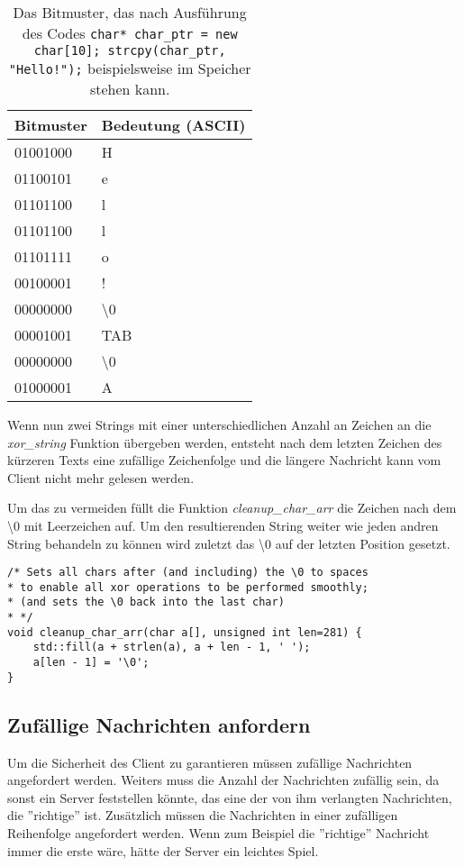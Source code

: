 \documentclass[]{article}
\begin{document}
\begin{table}[]
	\centering
	\begin{tabular}{l|l}
		Bitmuster  & Bedeutung (ASCII)\\ \hline
		01001000   & H                \\
		01100101   & e                \\
		01101100   & l                \\
		01101100   & l                \\
		01101111   & o                \\
		00100001   & !                \\
		00000000   & \textbackslash 0 \\
		00001001   & TAB              \\
		00000000   & \textbackslash 0 \\		
		01000001   & A                \\		
	\end{tabular}
	\caption{Das Bitmuster, das nach Ausführung des Codes \lstinline|char* char_ptr = new char[10]; strcpy(char_ptr, "Hello!");| beispielsweise im Speicher stehen kann.}
	\label{fig:bitcode_char_array}
\end{table}

Wenn nun zwei Strings mit einer unterschiedlichen Anzahl an Zeichen an die \textit{xor\_string} Funktion übergeben werden, entsteht nach dem letzten Zeichen des kürzeren Texts eine zufällige Zeichenfolge und die längere Nachricht kann vom Client nicht mehr gelesen werden.

Um das zu vermeiden füllt die Funktion \textit{cleanup\_char\_arr} die Zeichen nach dem \textbackslash 0 mit Leerzeichen auf. Um den resultierenden String weiter wie jeden andren String behandeln zu können wird zuletzt das \textbackslash 0 auf der letzten Position gesetzt.

\begin{lstlisting}
/* Sets all chars after (and including) the \0 to spaces
* to enable all xor operations to be performed smoothly;
* (and sets the \0 back into the last char)
* */
void cleanup_char_arr(char a[], unsigned int len=281) {
	std::fill(a + strlen(a), a + len - 1, ' ');
	a[len - 1] = '\0';
}
\end{lstlisting}

\subsection{Zufällige Nachrichten anfordern}
Um die Sicherheit des Client zu garantieren müssen zufällige Nachrichten angefordert werden. Weiters muss die Anzahl der Nachrichten zufällig sein, da sonst ein Server feststellen könnte, das eine der von ihm verlangten Nachrichten, die ''richtige'' ist. Zusätzlich müssen die Nachrichten in einer zufälligen Reihenfolge angefordert werden. Wenn zum Beispiel die ''richtige'' Nachricht immer die erste wäre, hätte der Server ein leichtes Spiel.
\end{document}
